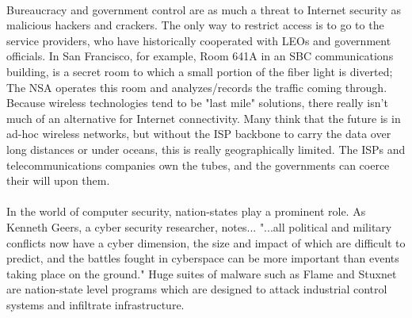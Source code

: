 \documentclass[11pt]{article}
\begin{document}
\paragraph{}
Bureaucracy and government control are as much a threat to Internet security as malicious hackers and crackers. The only way to restrict access is to go to the service providers, who have historically cooperated with LEOs and government officials. In San Francisco, for example, Room 641A\cite{wikip_room_641a} in an SBC communications building, is a secret room to which a small portion of the fiber light is diverted; The NSA operates this room and analyzes/records the traffic coming through. Because wireless technologies tend to be "last mile" solutions, there really isn't much of an alternative for Internet connectivity. Many think that the future is in ad-hoc wireless networks, but without the ISP backbone to carry the data over long distances or under oceans, this is really geographically limited. The ISPs and telecommunications companies own the tubes, and the governments can coerce their will upon them. 

\paragraph{}
In the world of computer security, nation-states play a prominent role. As Kenneth Geers, a cyber security researcher, notes... "...all political and military conflicts now have a cyber dimension, the size and impact of which are difficult to predict, and the battles fought in cyberspace can be more important than events taking place on the ground."\cite{geers_security} Huge suites of malware such as Flame\cite{kapersky_flame} and Stuxnet\cite{ars_technica_stuxnet} are nation-state level programs which are designed to attack industrial control systems and infiltrate infrastructure.
\end{document}
